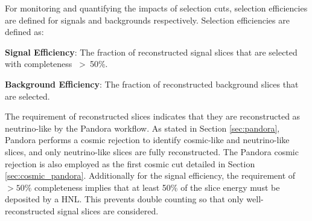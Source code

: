 %
%

For monitoring and quantifying the impacts of selection cuts, selection efficiencies are defined for signals and backgrounds respectively.
Selection efficiencies are defined as:
\begin{coloritemize}
	\item \textbf{Signal Efficiency}: The fraction of reconstructed signal slices that are selected with completeness ~>~50\%.

	\item \textbf{Background Efficiency}: The fraction of reconstructed background slices that are selected.
\end{coloritemize}


The requirement of reconstructed slices indicates that they are reconstructed as neutrino-like by the Pandora workflow.
As stated in Section \ref{sec:pandora}, Pandora performs a cosmic rejection to identify cosmic-like and neutrino-like slices, and only neutrino-like slices are fully reconstructed.
The Pandora cosmic rejection is also employed as the first cosmic cut detailed in Section \ref{sec:cosmic_pandora}.
Additionally for the signal efficiency, the requirement of $> 50\%$ completeness implies that at least 50\% of the slice energy must be deposited by a HNL.
This prevents double counting so that only well-reconstructed signal slices are considered.

